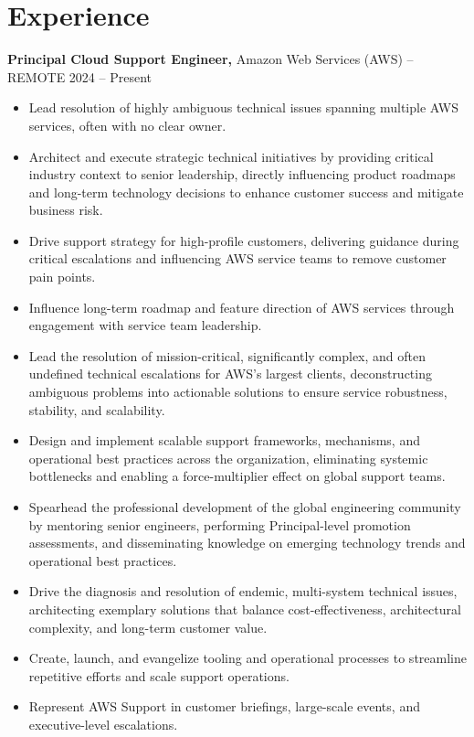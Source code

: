 \documentclass[11pt]{article}
\begin{document}
\vspace{-6.5pt}

\section*{Experience}
{\large\textbf{Principal Cloud Support Engineer,}} {Amazon Web Services (AWS)} -- REMOTE \hfill 2024 -- Present \\
\vspace{-9pt}
\begin{itemize}
    \item Lead resolution of highly ambiguous technical issues spanning multiple AWS services, often with no clear owner.
    \item Architect and execute strategic technical initiatives by providing critical industry context to senior leadership, directly influencing product roadmaps and long-term technology decisions to enhance customer success and mitigate business risk.
    \item Drive support strategy for high-profile customers, delivering guidance during critical escalations and influencing AWS service teams to remove customer pain points.
    \item Influence long-term roadmap and feature direction of AWS services through engagement with service team leadership.
    \item Lead the resolution of mission-critical, significantly complex, and often undefined technical escalations for AWS's largest clients, deconstructing ambiguous problems into actionable solutions to ensure service robustness, stability, and scalability.
    \item Design and implement scalable support frameworks, mechanisms, and operational best practices across the organization, eliminating systemic bottlenecks and enabling a force-multiplier effect on global support teams.
    \item Spearhead the professional development of the global engineering community by mentoring senior engineers, performing Principal-level promotion assessments, and disseminating knowledge on emerging technology trends and operational best practices.
    \item Drive the diagnosis and resolution of endemic, multi-system technical issues, architecting exemplary solutions that balance cost-effectiveness, architectural complexity, and long-term customer value.
    \item Create, launch, and evangelize tooling and operational processes to streamline repetitive efforts and scale support operations.
    \item Represent AWS Support in customer briefings, large-scale events, and executive-level escalations.
\end{itemize}
\end{document}
